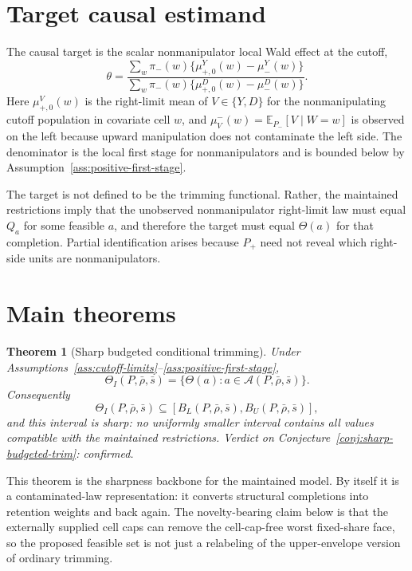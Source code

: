 \documentclass[11pt]{article}
\newcommand{\E}{\mathbb{E}}
\theoremstyle{definition}
\theoremstyle{plain}
\newtheorem{theorem}{Theorem}
\theoremstyle{remark}
\begin{document}
\section{Target causal estimand}
The causal target is the scalar nonmanipulator local Wald effect at the cutoff,
\[
  \theta =
  \frac{\sum_w \pi_-(w)\{\mu^Y_{+,0}(w)-\mu^Y_-(w)\}}
       {\sum_w \pi_-(w)\{\mu^D_{+,0}(w)-\mu^D_-(w)\}}.
\]
Here \(\mu^V_{+,0}(w)\) is the right-limit mean of \(V\in\{Y,D\}\) for the
nonmanipulating cutoff population in covariate cell \(w\), and
\(\mu^-_V(w)=\E_{P_-}[V\mid W=w]\) is observed on the left because upward manipulation
does not contaminate the left side.  The denominator is the local first stage for
nonmanipulators and is bounded below by Assumption~\ref{ass:positive-first-stage}.

The target is not defined to be the trimming functional.  Rather, the maintained
restrictions imply that the unobserved nonmanipulator right-limit law must equal \(Q_a\)
for some feasible \(a\), and therefore the target must equal \(\Theta(a)\) for that
completion.  Partial identification arises because \(P_+\) need not reveal which
right-side units are nonmanipulators.

\section{Main theorems}
\begin{theorem}[Sharp budgeted conditional trimming]\label{thm:sharp-budgeted-trimming}
Under Assumptions~\ref{ass:cutoff-limits}--\ref{ass:positive-first-stage},
\[
  \Theta_I(P,\bar\rho,\bar s)
  =
  \{\Theta(a):a\in\mathcal A(P,\bar\rho,\bar s)\}.
\]
Consequently
\[
  \Theta_I(P,\bar\rho,\bar s)\subseteq
  [B_L(P,\bar\rho,\bar s),B_U(P,\bar\rho,\bar s)],
\]
and this interval is sharp: no uniformly smaller interval contains all values compatible
with the maintained restrictions.  Verdict on Conjecture~\ref{conj:sharp-budgeted-trim}:
confirmed.
\end{theorem}

This theorem is the sharpness backbone for the maintained model.  By itself it is a
contaminated-law representation: it converts structural completions into retention weights
and back again.  The novelty-bearing claim below is that the externally supplied cell caps
can remove the cell-cap-free worst fixed-share face, so the proposed feasible set is not
just a relabeling of the upper-envelope version of ordinary trimming.
\end{document}
